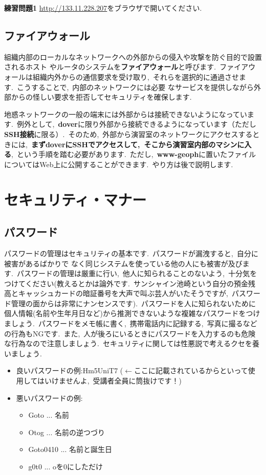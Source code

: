 \documentclass{jarticle}
\begin{document}
\begin{itembox}[l]{\textbf{練習問題1}}
\url{http://133.11.228.207}をブラウザで開いてください.\ 
\end{itembox}

\subsection{ファイアウォール}
組織内部のローカルなネットワークへの外部からの侵入や攻撃を防ぐ目的で設置されるホスト
やルータのシステムを{\bf ファイアウォール}と呼びます.\ ファイアウォールは組織内外からの通信要求を受け取り,\ それらを選択的に通過させます.\ こうすることで,\ 内部のネットワークには必要
なサービスを提供しながら外部からの怪しい要求を拒否してセキュリティを確保します.\ 

地惑ネットワークの一般の端末には外部からは接続できないようになっています.\ 例外として,\ {\bf dover}に限り外部から接続できるようになっています（ただし{\bf SSH接続}に限る）.\ そのため,\ 外部から演習室のネットワークにアクセスするときには,\ {\bf まずdoverにSSHでアクセスして,\ そこから演習室内部のマシンに入る},\ という手順を踏む必要があります.\ ただし,\ {\bf www-geoph}に置いたファイルについてはWeb上に公開することができます.\ やり方は後で説明します.\ 


\section{セキュリティ・マナー}
\subsection{パスワード}
パスワードの管理はセキュリティの基本です.\ 
パスワードが漏洩すると,\ 自分に被害があるばかりで なく同じシステムを使っている他の人にも被害が及びます.\ 
パスワードの管理は厳重に行い,\ 他人に知られることのないよう,\ 十分気をつけてください(教えるとかは論外です.\ サンシャイン池崎という自分の預金残高とキャッシュカードの暗証番号を大声で叫ぶ芸人がいたそうですが,\ パスワード管理の面からは非常にナンセンスです).\ 
パスワードを人に知られないために個人情報(名前や生年月日など)から推測できないような複雑なパスワードをつけましょう.\ 
パスワードをメモ帳に書く,\ 携帯電話内に記録する,\ 写真に撮るなどの行為もNGです.\ 
また,\ 人が後ろにいるときにパスワードを入力するのも危険な行為なので注意しましょう.\ セキュリティに関しては性悪説で考えるクセを養いましょう.\ 
\begin{itemize}
\item 良いパスワードの例:Hm5UniT7 ($\leftarrow$ここに記載されているからといって使用してはいけませんよ,\ 受講者全員に筒抜けです！)
\item 悪いパスワードの例:
	\begin{itemize}
	\item Goto ... 名前
	\item Otog ... 名前の逆つづり
	\item Goto0410 ... 名前と誕生日
	\item g0t0 ... oを0にしただけ
	\end{itemize}
\end{itemize}
\end{document}
